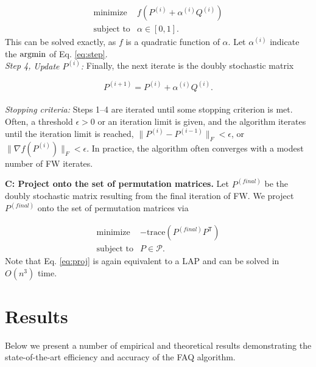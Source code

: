 \documentclass[10pt]{article}
\providecommand{\mc}[1]{\mathcal{#1}}
\newcommand{\PmcP}{P \in \mc{P}}
\providecommand{\mc}[1]{\mathcal{#1}}
\newcommand{\T}{^{\ensuremath{\mathsf{T}}}}
\newcommand{\argmin}{\operatornamewithlimits{argmin}}
\begin{document}
\begin{equation}
\begin{array}{cl}
			\text{minimize}   & f(P^{(i)} + \alpha^{(i)} Q^{(i)}) \\
			\text{subject to}  & \alpha \in [0,1].   
\end{array} \label{eq:step}
\end{equation}
This can be solved exactly, as $f$ is a quadratic function of $\alpha$.  Let $\alpha^{(i)}$ indicate the $\argmin$ of Eq. \eqref{eq:step}.
\\
{\it Step 4,} {\it Update $P^{(i)}$:} Finally, the next iterate is the doubly stochastic matrix 

\begin{equation} \label{eq:update}
	P^{(i+1)} = P^{(i)} + \alpha^{(i)} Q^{(i)}.
\end{equation}
\\
{\it Stopping criteria:} Steps 1--4 are iterated until some stopping criterion is met.  Often, a threshold $\epsilon>0$ or an iteration limit is given, and the algorithm iterates until the iteration limit is reached, $\|P^{(i)}-P^{(i-1)}\|_F<\epsilon$, or $\|\nabla f(P^{(i)})\|_F<\epsilon$.  In practice, the algorithm often converges with a modest number of FW iterates.

\noindent\textbf{C: Project onto the set of permutation matrices.}   Let $P^{(final)}$ be the doubly stochastic matrix resulting from the final iteration of FW.  We project $P^{(final)}$ onto the set of permutation matrices via

\begin{equation}
\begin{array}{cl}
			\text{minimize}   & -\text{trace}( P^{(final)} P\T) \\
			\text{subject to}  & \PmcP.   
\end{array} \label{eq:proj}
\end{equation}
  Note that Eq. \eqref{eq:proj} is again equivalent to a LAP and can be solved in $O(n^3)$ time.


\section{Results} 
\label{sec:results}

Below we present a number of empirical and theoretical results demonstrating the state-of-the-art efficiency and accuracy of the FAQ algorithm.
\end{document}
